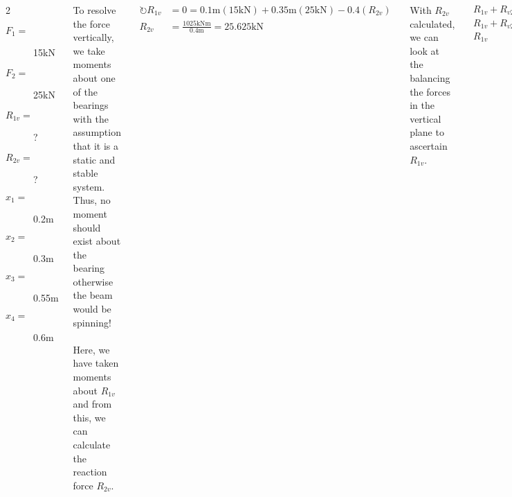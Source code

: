 \documentclass[20pt, a0paper, portrait]{tikzposter}
\begin{document}
\begin{columns}
{        \begin{multicols}{2}
        \begin{description}
          \item[$F_1=$] 15\si{\kilo\newton}
          \item[$F_2=$] 25\si{\kilo\newton}
          \item[$R_{1v}=$] ?
          \item[$R_{2v}=$] ?
          \item[$x_1=$] 0.2\si{\metre}
          \item[$x_2=$] 0.3\si{\metre}
          \item[$x_3=$] 0.55\si{\metre}
          \item[$x_4=$] 0.6\si{\metre}
        \end{description}
        \end{multicols}

        To resolve the force vertically, we take moments about one of the bearings with the assumption that it is a static and stable system. Thus, no moment should exist about the bearing otherwise the beam would be spinning!\\~\\

        Here, we have taken moments about $R_{1v}$ and from this, we can calculate the reaction force $R_{2v}$. 

        \begin{align}
          \circlearrowright R_{1v} &= 0 = 0.1\si{\metre}(15\si{\kilo\newton}) + 0.35\si{\metre}(25\si{\kilo\newton}) - 0.4(R_{2v}) \\
          R_{2v} &= \frac{1025\si{\kilo\newton\metre}}{0.4\si{\metre}} = 25.625\si{\kilo\newton}
        \end{align}

        With $R_{2v}$ calculated, we can look at the balancing the forces in the vertical plane to ascertain $R_{1v}$.

        \begin{align}
          R_{1v}+R_{v2}&=F_1+F_2\\
          R_{1v}+R_{v2}&=15\si{\kilo\newton}+25\si{\kilo\newton}\\
          R_{1v} &= 40\si{\kilo\newton}-25.625\si{\kilo\newton} = 14.375\si{\kilo\newton}
        \end{align}

      }
\end{columns}
\end{document}
